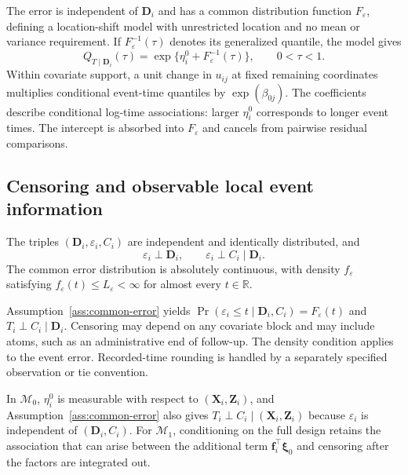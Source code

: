 The error is independent of $\bm{D}_i$ and has a common distribution function $F_\varepsilon$, defining a location-shift model with unrestricted location and no mean or variance requirement. If $F_\varepsilon^{-1}(\tau)$ denotes its generalized quantile, the model gives
\begin{equation}
 Q_{T\mid \bm{D}_i}(\tau)
 =\exp\{\eta_i^0+F_\varepsilon^{-1}(\tau)\},\qquad 0<\tau<1.
 \label{eq:quantile-interpretation}
\end{equation}
Within covariate support, a unit change in $u_{ij}$ at fixed remaining coordinates multiplies conditional event-time quantiles by $\exp(\beta_{0j})$. The coefficients describe conditional log-time associations: larger $\eta_i^0$ corresponds to longer event times. The intercept is absorbed into $F_\varepsilon$ and cancels from pairwise residual comparisons.

\subsection{Censoring and observable local event information}
\label{subsec:censoring}
\begin{assumption}
\label{ass:common-error}
The triples $(\bm{D}_i,\varepsilon_i,C_i)$ are independent and identically distributed, and
\begin{equation}
 \varepsilon_i\perp \bm{D}_i,\qquad
 \varepsilon_i\perp C_i\mid \bm{D}_i.
 \label{eq:censoring-independence}
\end{equation}
The common error distribution is absolutely continuous, with density $f_\varepsilon$ satisfying $f_\varepsilon(t)\le L_\varepsilon<\infty$ for almost every $t\in\mathbb R$.
\end{assumption}
Assumption~\ref{ass:common-error} yields $\Pr(\varepsilon_i\le t\mid \bm{D}_i,C_i)=F_\varepsilon(t)$ and $T_i\perp C_i\mid \bm{D}_i$. Censoring may depend on any covariate block and may include atoms, such as an administrative end of follow-up. The density condition applies to the event error. Recorded-time rounding is handled by a separately specified observation or tie convention.

In $\mathcal M_0$, $\eta_i^0$ is measurable with respect to $(\bm{X}_i,\bm{Z}_i)$, and Assumption~\ref{ass:common-error} also gives $T_i\perp C_i\mid(\bm{X}_i,\bm{Z}_i)$ because $\varepsilon_i$ is independent of $(\bm{D}_i,C_i)$. For $\mathcal M_1$, conditioning on the full design retains the association that can arise between the additional term $\bm{f}_i^\top\bm{\xi}_0$ and censoring after the factors are integrated out.

